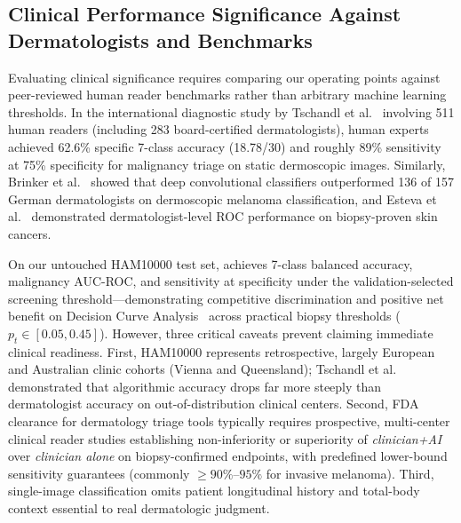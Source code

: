 \subsection{Clinical Performance Significance Against Dermatologists and Benchmarks}
Evaluating clinical significance requires comparing our operating points against peer-reviewed human reader benchmarks rather than arbitrary machine learning thresholds. In the international diagnostic study by Tschandl et al.~\cite{Tschandl2019comparison} involving 511 human readers (including 283 board-certified dermatologists), human experts achieved 62.6\% specific 7-class accuracy (18.78/30) and roughly 89\% sensitivity at 75\% specificity for malignancy triage on static dermoscopic images. Similarly, Brinker et al.~\cite{Brinker2019deep} showed that deep convolutional classifiers outperformed 136 of 157 German dermatologists on dermoscopic melanoma classification, and Esteva et al.~\cite{Esteva2017dermatologist} demonstrated dermatologist-level ROC performance on biopsy-proven skin cancers.

On our untouched HAM10000 test set, \WSixBestModel{} achieves \WSixBestBalAcc{} 7-class balanced accuracy, \WSixBestMalAUC{} malignancy AUC-ROC, and \WSixBestSensScr{} sensitivity at \WSixBestSpecScr{} specificity under the validation-selected screening threshold—demonstrating competitive discrimination and positive net benefit on Decision Curve Analysis~\cite{Vickers2006decision} across practical biopsy thresholds ($p_t \in [0.05, 0.45]$). However, three critical caveats prevent claiming immediate clinical readiness. First, HAM10000 represents retrospective, largely European and Australian clinic cohorts (Vienna and Queensland); Tschandl et al.~\cite{Tschandl2019comparison} demonstrated that algorithmic accuracy drops far more steeply than dermatologist accuracy on out-of-distribution clinical centers. Second, FDA clearance for dermatology triage tools typically requires prospective, multi-center clinical reader studies establishing non-inferiority or superiority of \emph{clinician+AI} over \emph{clinician alone} on biopsy-confirmed endpoints, with predefined lower-bound sensitivity guarantees (commonly $\ge 90\%$--$95\%$ for invasive melanoma). Third, single-image classification omits patient longitudinal history and total-body context essential to real dermatologic judgment.

